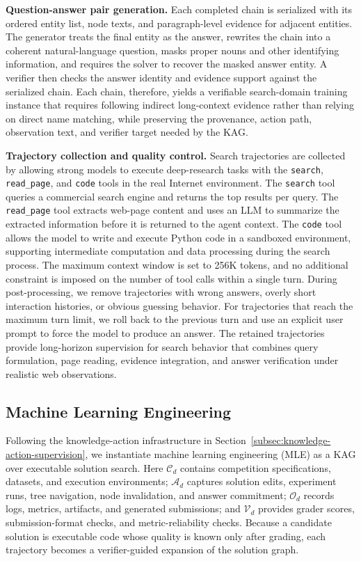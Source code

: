 \textbf{Question-answer pair generation.} Each completed chain is serialized with its ordered entity list, node texts, and paragraph-level evidence for adjacent entities. The generator treats the final entity as the answer, rewrites the chain into a coherent natural-language question, masks proper nouns and other identifying information, and requires the solver to recover the masked answer entity. A verifier then checks the answer identity and evidence support against the serialized chain. Each chain, therefore, yields a verifiable search-domain training instance that requires following indirect long-context evidence rather than relying on direct name matching, while preserving the provenance, action path, observation text, and verifier target needed by the KAG.

\textbf{Trajectory collection and quality control.} Search trajectories are collected by allowing strong models to execute deep-research tasks with the \texttt{search}, \texttt{read\_page}, and \texttt{code} tools in the real Internet environment. The \texttt{search} tool queries a commercial search engine and returns the top results per query. The \texttt{read\_page} tool extracts web-page content and uses an LLM to summarize the extracted information before it is returned to the agent context. The \texttt{code} tool allows the model to write and execute Python code in a sandboxed environment, supporting intermediate computation and data processing during the search process. The maximum context window is set to 256K tokens, and no additional constraint is imposed on the number of tool calls within a single turn. During post-processing, we remove trajectories with wrong answers, overly short interaction histories, or obvious guessing behavior. For trajectories that reach the maximum turn limit, we roll back to the previous turn and use an explicit user prompt to force the model to produce an answer. The retained trajectories provide long-horizon supervision for search behavior that combines query formulation, page reading, evidence integration, and answer verification under realistic web observations.


\subsection{Machine Learning Engineering}
\label{sec:mle_data_pipeline}
Following the knowledge-action infrastructure in Section~\ref{subsec:knowledge-action-supervision}, we instantiate machine learning engineering (MLE) as a KAG over executable solution search. Here $\mathcal{C}_d$ contains competition specifications, datasets, and execution environments; $\mathcal{A}_d$ captures solution edits, experiment runs, tree navigation, node invalidation, and answer commitment; $\mathcal{O}_d$ records logs, metrics, artifacts, and generated submissions; and $\mathcal{V}_d$ provides grader scores, submission-format checks, and metric-reliability checks. Because a candidate solution is executable code whose quality is known only after grading, each trajectory becomes a verifier-guided expansion of the solution graph.

